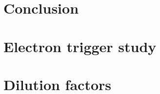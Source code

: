 \documentclass[10pt,a4paper,twoside]{report}
\begin{document}
\begin{sloppypar}
\chapter{Conclusion}\label{sec:summary}
    
\clearpage

\appendix
\chapter{Electron trigger study}\label{appendix:trigger}
    
\chapter{Dilution factors}\label{appendix:df}
    

\printbibliography[heading=bibintoc]
\end{sloppypar}
\end{document}
